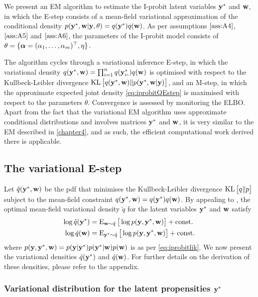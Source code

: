 We present an EM algorithm to estimate the I-probit latent variables ${\mathbf y}^*$ and ${\mathbf w}$, in which the E-step consists of a mean-field variational approximation of the conditional density $p({\mathbf y}^*,{\mathbf w}|{\mathbf y},\theta) = q({\mathbf y}^*)q({\mathbf w})$.
As per assumptions $\ref{ass:A4}$, $\ref{ass:A5}$ and $\ref{ass:A6}$, the parameters of the I-probit model consists of $\theta =\{ {\bm\alpha} = (\alpha_1,\dots,\alpha_m)^\top,\eta \}$.

The algorithm cycles through a variational inference E-step, in which the variational density $q(\by^*,\bw) = \prod_{i=1}^n q(\by^*_{i\bigcdot}) q(\bw)$ is optimised with respect to the Kullbeck-Leibler divergence $\operatorname{KL}\big[ q({\mathbf y}^*,{\mathbf w}) \Vert p({\mathbf y}^*,{\mathbf w}|{\mathbf y}) \big]$, and an M-step, in which the approximate expected joint density \cref{eq:iprobitQEstep} is maximised with respect to the parameters $\theta$. 
Convergence is assessed by monitoring the ELBO.
Apart from the fact that the variational EM algorithm uses approximate conditional distributions and involves matrices ${\mathbf y}^*$ and ${\mathbf w}$, it is very similar to the EM described in \cref{chapter4}, and as such, the efficient computational work derived there is applicable.

\subsection{The variational E-step}

Let $\tilde q({\mathbf y}^*,{\mathbf w})$ be the pdf that minimises the Kullbeck-Leibler divergence $\operatorname{KL}\big[ q \Vert p \big]$ subject to the mean-field constraint $q({\mathbf y}^*,{\mathbf w}) = q({\mathbf y}^*)q({\mathbf w})$.
By appealing to \citet[equation 10.9, p. 466]{bishop2006pattern}, the optimal mean-field variational density $\tilde q$ for the latent variables ${\mathbf y}^*$ and ${\mathbf w}$ satisfy
\begin{align}
  \log \tilde q({\mathbf y}^*) &= \operatorname{E}_{{\mathbf w}\sim\tilde q} \big[ \log p({\mathbf y},{\mathbf y}^*,{\mathbf w}) \big] + \text{const.}\hspace{0.01em} \label{eq:logqystar} \\
  \log \tilde q({\mathbf w}) &= \operatorname{E}_{{\mathbf y}^*\sim\tilde q} \big[ \log p({\mathbf y},{\mathbf y}^*,{\mathbf w}) \big] + \text{const.}\hspace{0.01em} \label{eq:logqw}
\end{align}
where $p({\mathbf y},{\mathbf y}^*,{\mathbf w}) = p({\mathbf y}|{\mathbf y}^*) p({\mathbf y}^*|{\mathbf w}) p({\mathbf w})$ is as per \cref{eq:iprobitlik}.
We now present the variational densities $\tilde q({\mathbf y}^*)$ and $\tilde q({\mathbf w})$.
For further details on the derivation of these densities, please refer to the appendix.

\subsubsection{Variational distribution for the latent propensities \texorpdfstring{${\mathbf y}^*$}{$y^*$}}

